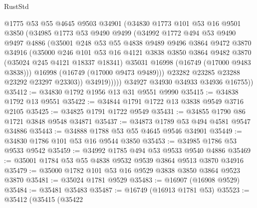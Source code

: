 \begin{lexlean}{RustStd}
\begin{coremodule}
                @1775
                @53
                @55
                @4645
                @9503
                @34901
                (@34830
                  @1773
                  @101
                  @53
                  @16
                  @9501
                  @3850
                  (@34985
                    @1773
                    @53
                    @9490
                    @9499
                    (@34992
                      @1772
                      @494
                      @53
                      @9490
                      @9497
                      @4886
                      (@35001
                        @248
                        @53
                        @55
                        @4838
                        @9489
                        @9496
                        @3864
                        @9472
                        @3870
                        @34916
                        (@35000
                          @246
                          @101
                          @53
                          @16
                          @4121
                          @3838
                          @3850
                          @3864
                          @9482
                          @3870
                          (@35024 @245 @4121 @18337 @18341)
                          @35031
                          @16998
                          (@16749 (@17000 @9483 @3838)))
                        @16998
                        (@16749 (@17000 @9473 @9489)))
                      @23282
                      @23285
                      @23288
                      @23292
                      @23297
                      @23303))
                  @34919)))))
        @34927
        @34930
        @34933
        @34936
        @16755))
@35412 := @34830 @1792 @1956 @13 @31 @9551 @9990
@35415 := @34838 @1792 @13 @9551
@35422 := @34844 @1791 @1722 @13 @3838 @9549 @3716 @2105
@35425 := @34825 @1791 @1722 @9549
@35431 := @34855 @1790 @86 @1721 @3848 @9548 @34871
@35437 := @34873 @1789 @53 @494 @4581 @9547 @34886
@35443 := @34888 @1788 @53 @55 @4645 @9546 @34901
@35449 := @34830 @1786 @101 @53 @16 @9544 @3850
@35453 := @34985 @1786 @53 @9533 @9542
@35459 := @34992 @1785 @494 @53 @9533 @9540 @4886
@35469 := @35001 @1784 @53 @55 @4838 @9532 @9539 @3864 @9513 @3870 @34916
@35479 := @35000 @1782 @101 @53 @16 @9529 @3838 @3850 @3864 @9523 @3870
@35481 := @35024 @1781 @9529
@35483 := @16907 (@16908 @9529)
@35484 := @35481 @35483
@35487 := @16749 (@16913 @1781 @53)
@35523 := @35412
    (@35415
      (@35422

\end{coremodule}
\end{lexlean}
